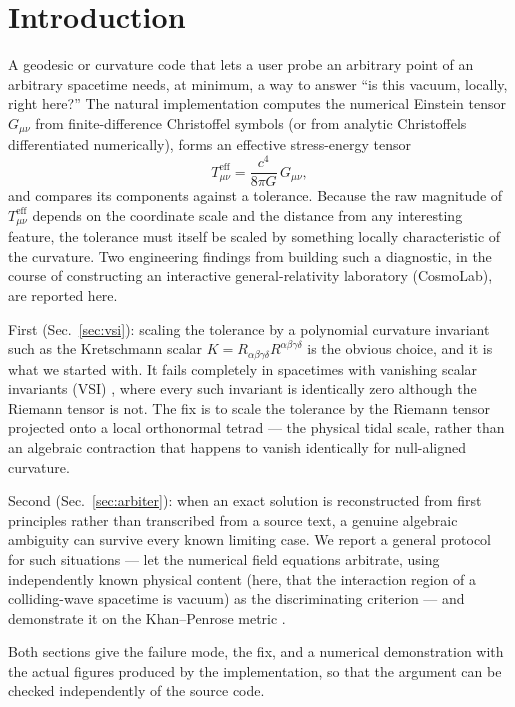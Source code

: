 \documentclass[aps,onecolumn,10pt,nofootinbib]{revtex4-2}
\begin{document}
\section{Introduction}

A geodesic or curvature code that lets a user probe an arbitrary point of
an arbitrary spacetime needs, at minimum, a way to answer ``is this vacuum,
locally, right here?'' The natural implementation computes the numerical
Einstein tensor $G_{\mu\nu}$ from finite-difference Christoffel symbols (or
from analytic Christoffels differentiated numerically), forms an effective
stress-energy tensor
\begin{equation}
  T^{\text{eff}}_{\mu\nu} = \frac{c^4}{8\pi G}\,G_{\mu\nu},
\end{equation}
and compares its components against a tolerance. Because the raw magnitude
of $T^{\text{eff}}_{\mu\nu}$ depends on the coordinate scale and the
distance from any interesting feature, the tolerance must itself be scaled
by something locally characteristic of the curvature. Two engineering
findings from building such a diagnostic, in the course of constructing an
interactive general-relativity laboratory (CosmoLab), are reported here.

First (Sec.~\ref{sec:vsi}): scaling the tolerance by a polynomial curvature
invariant such as the Kretschmann scalar $K = R_{\alpha\beta\gamma\delta}R^{\alpha\beta\gamma\delta}$
is the obvious choice, and it is what we started with. It fails completely
in spacetimes with vanishing scalar invariants (VSI)
\cite{Pravda2002,Brinkmann1925}, where every such invariant is identically
zero although the Riemann tensor is not. The fix is to scale the tolerance
by the Riemann tensor projected onto a local orthonormal tetrad — the
physical tidal scale, rather than an algebraic contraction that happens to
vanish identically for null-aligned curvature.

Second (Sec.~\ref{sec:arbiter}): when an exact solution is reconstructed
from first principles rather than transcribed from a source text, a genuine
algebraic ambiguity can survive every known limiting case. We report a
general protocol for such situations — let the numerical field equations
arbitrate, using independently known physical content (here, that the
interaction region of a colliding-wave spacetime is vacuum) as the
discriminating criterion — and demonstrate it on the Khan--Penrose metric
\cite{KhanPenrose1971,Griffiths1991}.

Both sections give the failure mode, the fix, and a numerical
demonstration with the actual figures produced by the implementation, so
that the argument can be checked independently of the source code.
\end{document}
